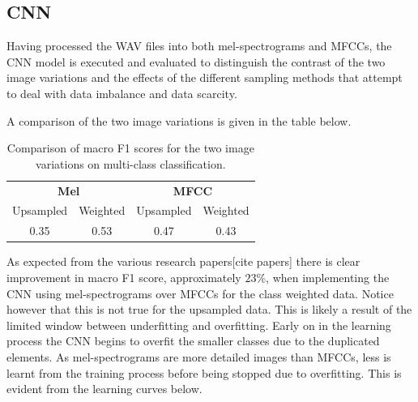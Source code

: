 \documentclass[11pt,a4paper,twoside]{article}
\begin{document}
\subsection{CNN}

Having processed the WAV files into both mel-spectrograms and MFCCs, the CNN model is executed and evaluated to distinguish the contrast of the two image variations and the effects of the different sampling methods that attempt to deal with data imbalance and data scarcity. 

A comparison of the two image variations is given in the table below.
\begin{table}[H]
\label{fig:}
\caption{Comparison of macro F1 scores for the two image variations on multi-class classification.}
\begin{center}
\begin{tabular}{|c|c|c|c|}
\hline
\multicolumn{2}{|c|}{\textbf{Mel}}&\multicolumn{2}{|c|}{\textbf{MFCC}}\\
\cline{1-4}
Upsampled & Weighted & Upsampled & Weighted\\
\hline
0.35 & 0.53 & 0.47 & 0.43\\
\hline
\end{tabular}
\label{tab1}
\end{center}
\end{table}

As expected from the various research papers[cite papers] there is clear improvement in macro F1 score, approximately $23\%$, when implementing the CNN using mel-spectrograms over MFCCs for the class weighted data. Notice however that this is not true for the upsampled data. This is likely a result of the limited window between underfitting and overfitting. Early on in the learning process the CNN begins to overfit the smaller classes due to the duplicated elements. As mel-spectrograms are more detailed images than MFCCs, less is learnt from the training process before being stopped due to overfitting. This is evident from the learning curves below.
\end{document}
